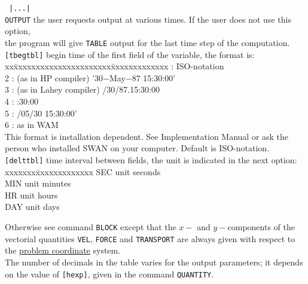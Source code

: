 \documentclass[12pt]{book}
\begin{document}
\begin{tabbing}
\, {\tt  |...|}    \> \\
{\tt OUTPUT}    \> the user requests output at various times. If the user does not use this option,\+\\
                   the program will give {\tt TABLE} output for the last time step of the computation.\-\\
{\tt [tbegtbl]} \> begin time of the first field of the variable, the format is:\+\\
                   \pushtabs
                   xx\=xxxxxxxxxxxxxxxxxxxxxx\=xxxxxxxxxxxxx  \>: ISO-notation                     \\
                   2 \>: (as in HP compiler)    \> '30$-$May$-$87 15:30:00' \\
                   3 \>: (as in Lahey compiler) /30/87.15:30:00        \\
                   4 \>:                        :30:00                 \\
                   5 \>:                        /05/30 15:30:00'       \\
                   6 \>: as in WAM                             \\
                   \poptabs
                   This format is installation dependent. See Implementation Manual or ask the\\
                   person who installed SWAN on your computer. Default is ISO-notation.\-\\
{\tt [delttbl]} \> time interval between fields, the unit is indicated in the next option:\+\\
                   \pushtabs
                   xxxxxxx\=xxxxxxxxxxxxx \kill
                   SEC \> unit seconds\\
                   MIN \> unit minutes\\
                   HR  \> unit hours\\
                   DAY \> unit days\-\\
                   \poptabs
\end{tabbing}

\noindent
Otherwise see command {\tt BLOCK} except that the $x-$ and $y-$components of the vectorial quantities {\tt VEL},
{\tt FORCE} and {\tt TRANSPORT} are always given with respect to the \underline{problem coordinate} system.
\\[2ex]
The number of decimals in the table varies for the output parameters; it depends on the value of {\tt [hexp]}, given
in the command {\tt QUANTITY}.
\end{document}

